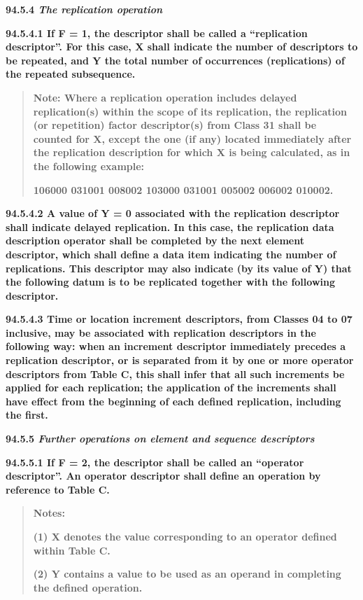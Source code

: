 \textbf{94.5.4 \emph{The replication operation}}

\textbf{94.5.4.1 If F = 1, the descriptor shall be called a ``replication descriptor''. For this case, X shall indicate the number of descriptors to be repeated, and Y the total number of occurrences (replications) of the repeated subsequence.}

\begin{quote}
\textbf{Note: Where a replication operation includes delayed replication(s) within the scope of its replication, the replication (or repetition) factor descriptor(s) from Class 31 shall be counted for X, except the one (if any) located immediately after the replication description for which X is being calculated, as in the following example:}

\textbf{106000 031001 008002 103000 031001 005002 006002 010002.}
\end{quote}

\textbf{94.5.4.2 A value of Y = 0 associated with the replication descriptor shall indicate delayed replication. In this case, the replication data description operator shall be completed by the next element descriptor, which shall define a data item indicating the number of replications. This descriptor may also indicate (by its value of Y) that the following datum is to be replicated together with the following descriptor.}

\textbf{94.5.4.3 Time or location increment descriptors, from Classes 04 to 07 inclusive, may be associated with replication descriptors in the following way: when an increment descriptor immediately precedes a replication descriptor, or is separated from it by one or more operator descriptors from Table C, this shall infer that all such increments be applied for each replication; the application of the increments shall have effect from the beginning of each defined replication, including the first.}

\textbf{94.5.5 \emph{Further operations on element and sequence descriptors}}

\textbf{94.5.5.1 If F = 2, the descriptor shall be called an ``operator descriptor''. An operator descriptor shall define an operation by reference to Table C.}

\begin{quote}
\textbf{Notes:}

\textbf{(1) X denotes the value corresponding to an operator defined within Table C.}

\textbf{(2) Y contains a value to be used as an operand in completing the defined operation.}
\end{quote}

